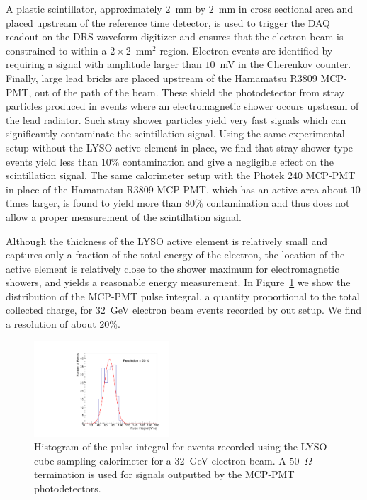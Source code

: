 \documentclass[12pt]{article}
\begin{document}
{A plastic scintillator, approximately $2$~mm by $2$~mm in cross sectional area
and placed upstream of the reference time detector, is used to trigger the DAQ
readout on the DRS waveform digitizer and ensures that the electron beam is
constrained to within a $2\times 2$~mm$^2$ region. Electron events are identified by
requiring a signal with amplitude larger than $10$~mV in the Cherenkov counter.
Finally, large lead bricks are placed upstream of the Hamamatsu R3809 MCP-PMT,
out of the path of the beam. These shield the photodetector from stray particles
produced in events where an electromagnetic shower occurs upstream of the lead
radiator. Such stray shower particles yield very fast signals which can
significantly contaminate the scintillation signal. Using the same experimental
setup without the LYSO active element in place, we find that stray shower type
events yield less than $10\%$ contamination and give a negligible effect on the
scintillation signal. The same calorimeter setup with the Photek 240 MCP-PMT in
place of the Hamamatsu R3809 MCP-PMT, which has an active area about $10$ times
larger, is found to yield more than $80\%$ contamination and thus does not allow
a proper measurement of the scintillation signal.

Although the thickness of the LYSO active element is relatively small and
captures only a fraction of the total energy of the electron, the location of
the active element is relatively close to the shower maximum for electromagnetic
showers, and yields a reasonable energy measurement. In
Figure~\ref{fig:LYSOCubeEnergy32GeV} we show the distribution of the MCP-PMT
pulse integral, a quantity proportional to the total collected charge, for
$32$~GeV electron beam events recorded by out setup. We find a resolution of
about $20\%$.


\begin{figure}[h] \centering
\includegraphics[width=0.45\textwidth]{figs/TOF_Electron_LYSOCube_32GeV_energy} 
\caption{ Histogram of the pulse integral for events recorded using
the LYSO cube sampling calorimeter for a $32$~GeV electron beam. A
$50$~$\Omega$ termination is used for signals outputted by the MCP-PMT
photodetectors. } 
\label{fig:LYSOCubeEnergy32GeV}
\end{figure}

}
\end{document}
